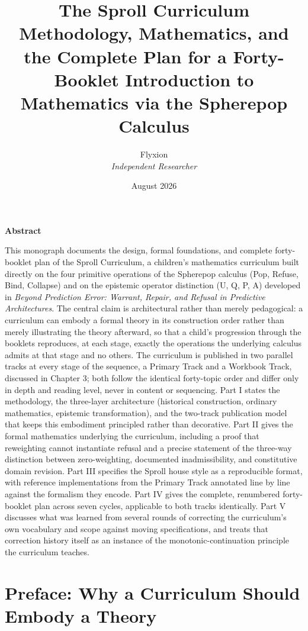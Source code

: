 \documentclass[11pt,twoside]{book}
\title{\textbf{The Sproll Curriculum}\\[0.3em]\Large Methodology, Mathematics, and the Complete Plan for a Forty-Booklet Introduction to Mathematics via the Spherepop Calculus}
\author{Flyxion\\ \textit{Independent Researcher}}
\date{August 2026}
\begin{document}
\frontmatter
\maketitle

\begin{center}
\textbf{Abstract}
\end{center}
\noindent This monograph documents the design, formal foundations, and complete forty-booklet plan of the Sproll Curriculum, a children's mathematics curriculum built directly on the four primitive operations of the Spherepop calculus (Pop, Refuse, Bind, Collapse) and on the epistemic operator distinction (U, Q, P, A) developed in \emph{Beyond Prediction Error: Warrant, Repair, and Refusal in Predictive Architectures}. The central claim is architectural rather than merely pedagogical: a curriculum can embody a formal theory in its construction order rather than merely illustrating the theory afterward, so that a child's progression through the booklets reproduces, at each stage, exactly the operations the underlying calculus admits at that stage and no others. The curriculum is published in two parallel tracks at every stage of the sequence, a Primary Track and a Workbook Track, discussed in Chapter 3; both follow the identical forty-topic order and differ only in depth and reading level, never in content or sequencing. Part I states the methodology, the three-layer architecture (historical construction, ordinary mathematics, epistemic transformation), and the two-track publication model that keeps this embodiment principled rather than decorative. Part II gives the formal mathematics underlying the curriculum, including a proof that reweighting cannot instantiate refusal and a precise statement of the three-way distinction between zero-weighting, documented inadmissibility, and constitutive domain revision. Part III specifies the Sproll house style as a reproducible format, with reference implementations from the Primary Track annotated line by line against the formalism they encode. Part IV gives the complete, renumbered forty-booklet plan across seven cycles, applicable to both tracks identically. Part V discusses what was learned from several rounds of correcting the curriculum's own vocabulary and scope against moving specifications, and treats that correction history itself as an instance of the monotonic-continuation principle the curriculum teaches.
\vspace{1em}

\tableofcontents

\chapter*{Preface: Why a Curriculum Should Embody a Theory}
\end{document}
